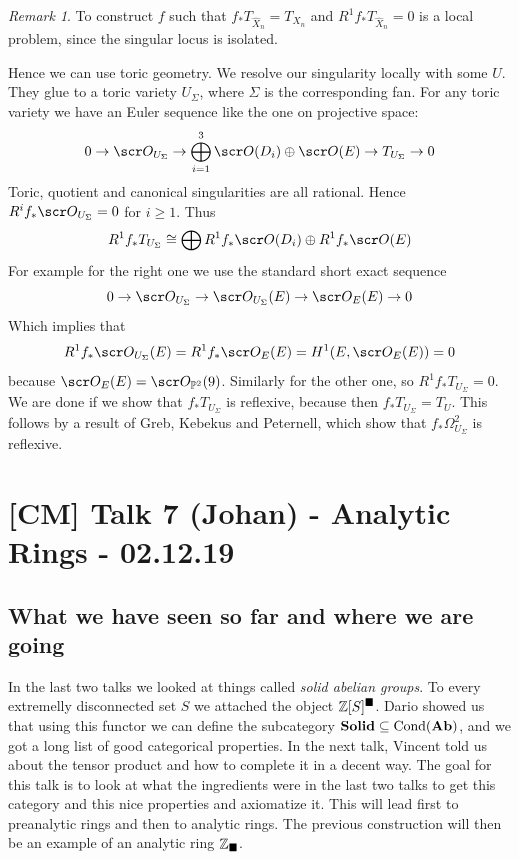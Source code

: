 \documentclass[A4paper, british]{amsart}
\theoremstyle{darkgreentheorem}
\theoremstyle{darkbluedefinition}
\theoremstyle{darkredexample}
\theoremstyle{remark}
\newtheorem{rem}[thm]{Remark}
\DeclareMathOperator{\Cond}{Cond}
\newcommand{\Solid}{\mathbf{Solid}}
\newcommand{\1}{\mathbbm{1}}
\newcommand{\op}{\oplus}
\newcommand{\sub}{\subseteq}
\newcommand{\solid}{^{\blacksquare}}
\newcommand{\usolid}{_{\blacksquare}}
\begin{document}
\begin{rem}
    To construct $f$ such that $f_{*}T_{\hat{X}_{n}}=T_{X_{n}}$ and $R^{1}f_{*}T_{\hat{X}_{n}}=0$ is a local problem, since the singular locus is isolated.
\end{rem}

Hence we can use toric geometry.
We resolve our singularity locally with some $U$.
They glue to a toric variety $U_{\Sigma}$, where $\Sigma $ is the corresponding fan.
For any toric variety we have an Euler sequence like the one on projective space:
\[ 0\to \O_{U_{\Sigma}}\to \bigoplus_{i=1}^{3}\O(D_{i})\op \O(E)\to T_{U_{\Sigma}}\to 0 \]
Toric, quotient and canonical singularities are all rational.
Hence $R^{i}f_{*}\O_{U_{\Sigma}}=0$ for $i\geqslant 1$.
Thus
\[ R^{1}f_{*}T_{U_{\Sigma}}\cong \bigoplus R^{1}f_{*}\O(D_{i})\op R^{1}f_{*}\O(E) \]
For example for the right one we use the standard short exact sequence
\[ 0\to \O_{U_{\Sigma}}\to \O_{U_{\Sigma}}(E)\to \O_{E}(E)\to 0 \]
Which implies that
\[ R^{1}f_{*}\O_{U_{\Sigma}}(E)=R^{1}f_{*}\O_{E}(E)=H^{1}(E,\O_{E}(E))=0 \]
because $\O_{E}(E)=\O_{\P^{2}}(9)$.
Similarly for the other one, so $R^{1}f_{*}T_{U_{\Sigma}}=0$.
We are done if we show that $f_{*}T_{U_{\Sigma}}$ is reflexive, because then $f_{*}T_{U_{\Sigma}}=T_{U}$.
This follows by a result of Greb, Kebekus and Peternell, which show that $f_{*}\Omega_{U_{\Sigma}}^{2}$ is reflexive.

\section{[CM] Talk 7 (Johan) - Analytic Rings - 02.12.19}

\subsection{What we have seen so far and where we are going}

In the last two talks we looked at things called \textit{solid abelian groups}.
To every extremelly disconnected set $S$ we attached the object $\Z[S]\solid$.
Dario showed us that using this functor we can define the subcategory $\Solid\sub \Cond(\Ab)$, and we got a long list of good categorical properties.
In the next talk, Vincent told us about the tensor product and how to complete it in a decent way.
The goal for this talk is to look at what the ingredients were in the last two talks to get this category and this nice properties and axiomatize it.
This will lead first to preanalytic rings and then to analytic rings.
The previous construction will then be an example of an analytic ring $\Z\usolid$.
\end{document}
